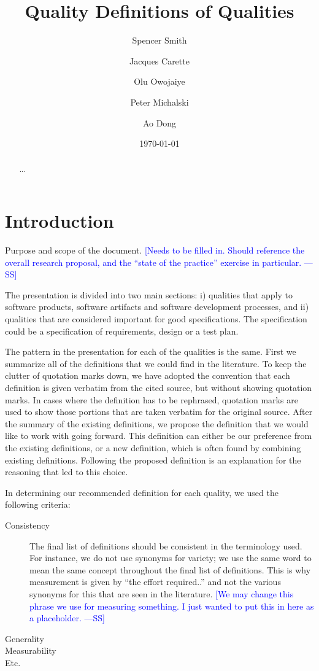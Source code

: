 \documentclass[letterpaper,cleveref]{lipics-v2019}
\title{Quality Definitions of Qualities}
\author{Spencer Smith}{McMaster University, Canada}{smiths@mcmaster.ca}{}{}
\author{Jacques Carette}{McMaster University, Canada}{carette@mcmaster.ca}{}{}
\author{Olu Owojaiye}{McMaster University, Canada}{owojaiyo@mcmaster.ca}{}{}
\author{Peter Michalski}{McMaster University, Canada}{michap@mcmaster.ca}{}{}
\author{Ao Dong}{McMaster University, Canada}{donga9@mcmaster.ca}{}{}
\date{\today}
\newcommand{\authornote}[3]{\textcolor{#1}{[#3 ---#2]}}
\newcommand{\authornote}[3]{}
\newcommand{\wss}[1]{\authornote{blue}{SS}{#1}} %
\theoremstyle{definition}
\begin{document}
\maketitle

\begin{abstract}
	...
\end{abstract}

\tableofcontents

\section{Introduction} \label{SecIntroduction}

Purpose and scope of the document.  \wss{Needs to be filled in.  Should
	reference the overall research proposal, and the ``state of the practice''
	exercise in particular.}

The presentation is divided into two main sections: i) qualities that apply to
software products, software artifacts and software development processes, and
ii) qualities that are considered important for good specifications.  The
specification could be a specification of requirements, design or a test plan.

The pattern in the presentation for each of the qualities is the same.  First we
summarize all of the definitions that we could find in the literature.  To keep
the clutter of quotation marks down, we have adopted the convention that each
definition is given verbatim from the cited source, but without showing
quotation marks.  In cases where the definition has to be rephrased, quotation
marks are used to show those portions that are taken verbatim for the original
source.  After the summary of the existing definitions, we propose the
definition that we would like to work with going forward.  This definition can
either be our preference from the existing definitions, or a new definition,
which is often found by combining existing definitions.  Following the proposed
definition is an explanation for the reasoning that led to this choice.

In determining our recommended definition for each quality, we used the
following criteria:

\begin{description}
\item[Consistency] The final list of definitions should be consistent in the
  terminology used.  For instance, we do not use synonyms for variety; we use
  the same word to mean the same concept throughout the final list of
  definitions.  This is why measurement is given by ``the effort required..''
  and not the various synonyms for this that are seen in the literature. \wss{We
    may change this phrase we use for measuring something.  I just wanted to put
    this in here as a placeholder.}
\item[Generality]
\item[Measurability]
\item[Etc.]
\end{description}
\end{document}
